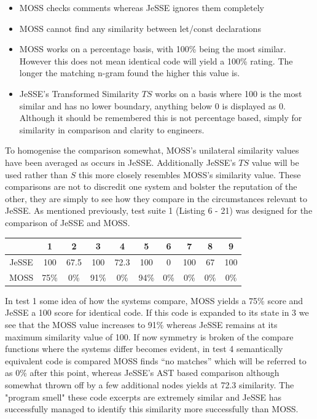 \documentclass[jou,apacite]{apa6}
\begin{document}
\begin{itemize}
  \setlength\itemsep{-0.5em}
  \item MOSS checks comments whereas JeSSE ignores them completely 
  \item MOSS cannot find any similarity between let/const declarations
  \item MOSS works on a percentage basis, with 100\% being the most similar. However this does not mean identical code will yield a 100\% rating. The longer the matching n-gram found the higher this value is.
  \item JeSSE's Transformed Similarity $TS$ works on a basis where 100 is the most similar and has no lower boundary, anything below 0 is displayed as 0. Although it should be remembered this is not percentage based, simply for similarity in comparison and clarity to engineers. 
\end{itemize}

To homogenise the comparison somewhat, MOSS's unilateral similarity values have been averaged as occurs in JeSSE. Additionally JeSSE's $TS$ value will be used rather than $S$ this more closely resembles MOSS's similarity value. These comparisons are not to discredit one system and bolster the reputation of the other, they are simply to see how they compare in the circumstances relevant to JeSSE. As mentioned previously, test suite 1 (Listing 6 - 21) was designed for the comparison of JeSSE and MOSS.

\setlength{\tabcolsep}{4pt}
\renewcommand{\arraystretch}{1.5}

\begin{center}
 \begin{tabular}{||c c c c c c c c c c||} 
 \hline
  & 1 & 2 & 3 & 4 & 5 & 6 & 7 & 8 & 9 \\ [-0.2ex] 
 \hline\hline
 JeSSE & 100 & 67.5 & 100 & 72.3 & 100 & 0 & 100 & 67 & 100 \\ 
 \hline
 MOSS  & 75\% & 0\% & 91\% & 0\% & 94\% & 0\% & 0\%  & 0\% & 0\%\\
 \hline
\end{tabular}
\end{center}

In test 1 some idea of how the systems compare, MOSS yields a 75\% score and JeSSE a 100 score for identical code. If this code is expanded to its state in 3 we see that the MOSS value increases to 91\% whereas JeSSE remains at its maximum similarity value of 100. If now symmetry is broken  of the compare functions where the systems differ becomes evident, in test 4 semantically equivalent code is compared MOSS finds “no matches” which will be referred to as 0\% after this point, whereas JeSSE's AST based comparison although somewhat thrown off by a few additional nodes yields at 72.3 similarity. The "program smell" these code excerpts are extremely similar and JeSSE has successfully managed to identify this similarity more successfully than MOSS. 
\end{document}
